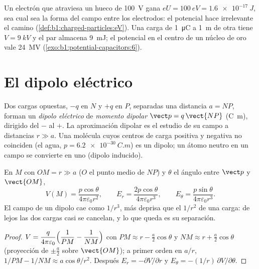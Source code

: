 \begin{example}\label{ex:b1:potential-capacitors:eV}
Un electrón que atraviesa un hueco de \qty{100}{V} gana $eU = \qty{100}{eV} =
\qty{1.6e-17}{J}$, sea cual sea la forma del campo entre los electrodos:
el potencial hace irrelevante el camino
(\cref{def:b1:charged-particles:eV}). Una carga de \qty{1}{\micro C} a
\qty{1}{m} de otra tiene $V = \qty{9}{kV}$ y el par almacena
\qty{9}{mJ}; el potencial en el centro de un núcleo de oro vale
\qty{24}{MV} (\cref{exo:b1:potential-capacitors:6}).
\end{example}

\section{El dipolo eléctrico}

\begin{definition}\label{def:b1:potential-capacitors:dipole}
Dos cargas opuestas, $-q$ en $N$ y $+q$ en $P$, separadas una distancia
$a = NP$, forman un \emph{dipolo eléctrico} de \emph{momento dipolar}
$\vect p = q\,\vect{NP}$ (\unit{C.m}), dirigido del $-$ al $+$. La
aproximación dipolar es el estudio de su campo a distancias $r \gg a$.
Una molécula cuyos centros de carga positiva y negativa no coinciden
(el agua, $p = \qty{6.2e-30}{C.m}$) es un dipolo; un átomo neutro en un
campo se convierte en uno (dipolo inducido).
\end{definition}

\begin{proposition}\label{prop:b1:potential-capacitors:dipolefield}
En $M$ con $OM = r \gg a$ ($O$ el punto medio de $NP$) y $\theta$ el
ángulo entre $\vect p$ y $\vect{OM}$,
\[
V(M) = \frac{p\cos\theta}{4\pi\varepsilon_0 r^2}, \qquad
E_r = \frac{2p\cos\theta}{4\pi\varepsilon_0r^3}, \qquad
E_\theta = \frac{p\sin\theta}{4\pi\varepsilon_0r^3} .
\]
El campo de un dipolo cae como $1/r^3$, más deprisa que el $1/r^2$ de una
carga: de lejos las dos cargas casi se cancelan, y lo que queda es su
separación.
\end{proposition}

\begin{proof}
$V = \dfrac{q}{4\pi\varepsilon_0}\Bigl(\dfrac1{PM} - \dfrac1{NM}\Bigr)$ con
$PM \approx r - \tfrac a2\cos\theta$ y $NM \approx r + \tfrac a2\cos\theta$
(proyección de $\pm\tfrac a2$ sobre $\vect{OM}$); a primer orden en $a/r$,
$1/PM - 1/NM \approx a\cos\theta/r^2$. Después $E_r = -\partial V/\partial r$ y
$E_\theta = -(1/r)\,\partial V/\partial\theta$.
\end{proof}

